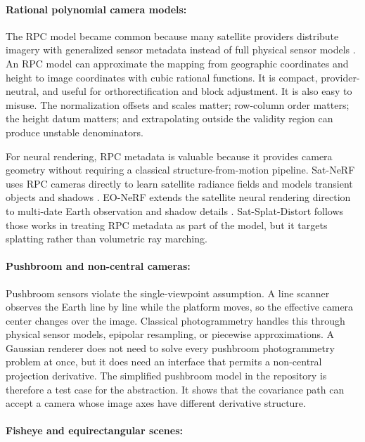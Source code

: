 \documentclass{article}
\begin{document}
\paragraph{Rational polynomial camera models:}

The RPC model became common because many satellite providers distribute imagery with generalized sensor metadata instead of full physical sensor models \citep{tao2001rpc,grodecki2003block}. An RPC model can approximate the mapping from geographic coordinates and height to image coordinates with cubic rational functions. It is compact, provider-neutral, and useful for orthorectification and block adjustment. It is also easy to misuse. The normalization offsets and scales matter; row-column order matters; the height datum matters; and extrapolating outside the validity region can produce unstable denominators.

For neural rendering, RPC metadata is valuable because it provides camera geometry without requiring a classical structure-from-motion pipeline. Sat-NeRF uses RPC cameras directly to learn satellite radiance fields and models transient objects and shadows \citep{mar2022satnerf}. EO-NeRF extends the satellite neural rendering direction to multi-date Earth observation and shadow details \citep{mar2023eonerf}. Sat-Splat-Distort follows those works in treating RPC metadata as part of the model, but it targets splatting rather than volumetric ray marching.

\paragraph{Pushbroom and non-central cameras:}

Pushbroom sensors violate the single-viewpoint assumption. A line scanner observes the Earth line by line while the platform moves, so the effective camera center changes over the image. Classical photogrammetry handles this through physical sensor models, epipolar resampling, or piecewise approximations. A Gaussian renderer does not need to solve every pushbroom photogrammetry problem at once, but it does need an interface that permits a non-central projection derivative. The simplified pushbroom model in the repository is therefore a test case for the abstraction. It shows that the covariance path can accept a camera whose image axes have different derivative structure.

\paragraph{Fisheye and equirectangular scenes:}
\end{document}
